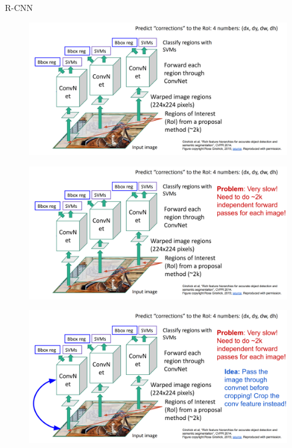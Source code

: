 \documentclass[10pt]{beamer}
\theoremstyle{remark}
\theoremstyle{definition}
\begin{document}
\begin{frame}[allowframebreaks]{R-CNN}

\begin{figure}
\centering
\includegraphics[width=1.0\textwidth,height=1.0\textheight,keepaspectratio]{./images/rcnn_1.png}
\end{figure}

\framebreak

\begin{figure}
\centering
\includegraphics[width=1.0\textwidth,height=1.0\textheight,keepaspectratio]{./images/rcnn_2.png}
\end{figure}

\framebreak

\begin{figure}
\centering
\includegraphics[width=1.0\textwidth,height=1.0\textheight,keepaspectratio]{./images/rcnn_3.png}
\end{figure}

    
\end{frame}
\end{document}
